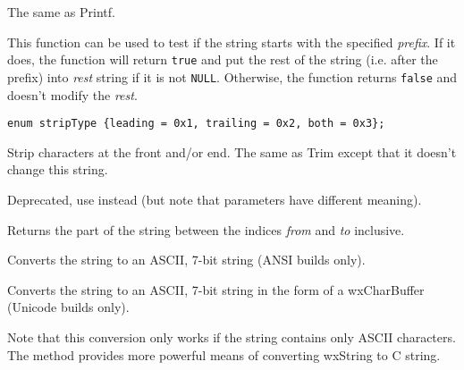 The same as Printf.

\label{wxstringstartswith}


This function can be used to test if the string starts with the specified 
{\it prefix}. If it does, the function will return {\tt true} and put the rest
of the string (i.e. after the prefix) into {\it rest} string if it is not 
{\tt NULL}. Otherwise, the function returns {\tt false} and doesn't modify the 
{\it rest}.

\label{wxstringstrip}

\begin{verbatim}
enum stripType {leading = 0x1, trailing = 0x2, both = 0x3};
\end{verbatim}


Strip characters at the front and/or end. The same as Trim except that it
doesn't change this string.

\label{wxstringsubstring}


Deprecated, use  instead (but note that parameters
have different meaning).

Returns the part of the string between the indices {\it from} and {\it to}
inclusive.

\label{wxstringtoascii}


Converts the string to an ASCII, 7-bit string (ANSI builds only).


Converts the string to an ASCII, 7-bit string in the form of
a wxCharBuffer (Unicode builds only).

Note that this conversion only works if the string contains only ASCII
characters. The  method provides more
powerful means of converting wxString to C string.

\label{wxstringtodouble}


